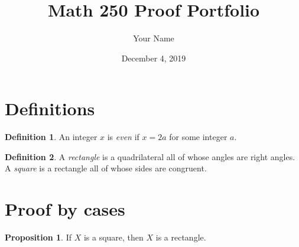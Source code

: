 \documentclass[12pt]{article} %
\theoremstyle{definition}
\newtheorem*{defn}{Definition}
\newtheorem*{prop}{Proposition}
\begin{document}
\title{Math 250 Proof Portfolio}
\author{Your Name}
\date{December 4, 2019}

\maketitle %



\section*{Definitions} %


\begin{defn}
An integer $x$ is \textit{even}
if $x = 2a$ for some integer $a$.
\end{defn}

\begin{defn}
 A \textit{rectangle} is a quadrilateral
 all of whose angles are right angles.
A \textit{square} is a rectangle
all of whose sides are congruent.
\end{defn}





\section{Proof by cases} %

\begin{prop} %
If $X$ is a square, then $X$ is a rectangle.
\end{prop}
\end{document}
